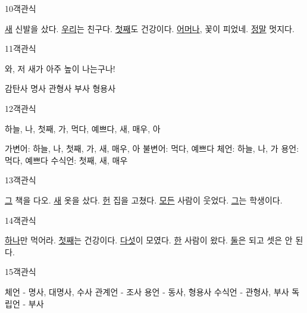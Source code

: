 \documentclass[fs9,seriesRus]{korfarm-base}
\begin{document}
\begin{kfQBlock}{10}{객관식}
\begin{kfChoices}
\kfChoice \uline{새} 신발을 샀다.
\kfChoice \uline{우리}는 친구다.
\kfChoice \uline{첫째}도 건강이다.
\kfChoice \uline{어머나}, 꽃이 피었네.
\kfChoice \uline{정말} 멋지다.
\end{kfChoices}
\end{kfQBlock}
\begin{kfQBlock}{11}{객관식}
\begin{kfEvidence}와, 저 새가 아주 높이 나는구나!\end{kfEvidence}
\begin{kfChoices}
\kfChoice 감탄사
\kfChoice 명사
\kfChoice 관형사
\kfChoice 부사
\kfChoice 형용사
\end{kfChoices}
\end{kfQBlock}
\begin{kfQBlock}{12}{객관식}
\begin{kfEvidence}하늘, 나, 첫째, 가, 먹다, 예쁘다, 새, 매우, 아\end{kfEvidence}
\begin{kfChoices}
\kfChoice 가변어: 하늘, 나, 첫째, 가, 새, 매우, 아
\kfChoice 불변어: 먹다, 예쁘다
\kfChoice 체언: 하늘, 나, 가
\kfChoice 용언: 먹다, 예쁘다
\kfChoice 수식언: 첫째, 새, 매우
\end{kfChoices}
\end{kfQBlock}
\begin{kfQBlock}{13}{객관식}
\begin{kfChoices}
\kfChoice \uline{그} 책을 다오.
\kfChoice \uline{새} 옷을 샀다.
\kfChoice \uline{헌} 집을 고쳤다.
\kfChoice \uline{모든} 사람이 웃었다.
\kfChoice \uline{그}는 학생이다.
\end{kfChoices}
\end{kfQBlock}
\begin{kfQBlock}{14}{객관식}
\begin{kfChoices}
\kfChoice \uline{하나}만 먹어라.
\kfChoice \uline{첫째}는 건강이다.
\kfChoice \uline{다섯}이 모였다.
\kfChoice \uline{한} 사람이 왔다.
\kfChoice \uline{둘}은 되고 셋은 안 된다.
\end{kfChoices}
\end{kfQBlock}
\begin{kfQBlock}{15}{객관식}
\begin{kfChoices}
\kfChoice 체언 - 명사, 대명사, 수사
\kfChoice 관계언 - 조사
\kfChoice 용언 - 동사, 형용사
\kfChoice 수식언 - 관형사, 부사
\kfChoice 독립언 - 부사
\end{kfChoices}
\end{kfQBlock}
\end{document}

